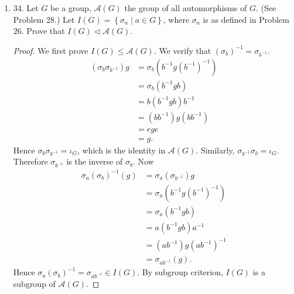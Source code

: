 \begin{enumerate}
(b) $\operatorname{Ker} \psi=Z(G)$, the center of $G$.
\begin{proof}
	\begin{align*}
		g \in Z(G) &\iff \forall x \in G, x g = g x\\
		&\iff \forall x \in G, g x g^{-1}  = x\\
		&\iff \forall x \in G, \sigma_g(x) = x \\
		&\iff \sigma_g = \iota_G\\
		&\iff \varphi(g) = \iota_G \\
		&\iff g \in \operatorname{ker} \varphi
	.\end{align*}
	Where $\iota_G$ is the identity map, which serves as the identity element in $A(G)$.
\end{proof}

	\item 34. Let $G$ be a group, $\mathscr{A}(G)$ the group of all automorphisms of $G$. (See Problem 28.) Let $I(G)=\left\{\sigma_a \mid a \in G\right\}$, where $\sigma_a$ is as defined in Problem $26 .$ Prove that $I(G) \triangleleft \mathscr{A}(G)$.
\begin{proof}
	We first prove $I(G) \le \mathscr{A}(G)$. We verify that $(\sigma_b)^{-1} = \sigma_{b^{-1} }$.
	\begin{align*}
		(\sigma_b \sigma_{b^{-1}}) g 
		&= \sigma_b (b^{-1}  g (b^{-1} )^{-1}) \\
		&= \sigma_b(b^{-1} gb) \\
		&= b(b^{-1} gb) b^{-1} \\
		&= (bb^{-1} )g(bb^{-1} ) \\
		&= e g e \\
		&= g
	.\end{align*}
	Hence $\sigma_b \sigma_{b^{-1} } = \iota_G$, which is the identity in $\mathscr{A}(G)$. Similarly, $\sigma_{b^{-1} }\sigma_b = \iota_G$. Therefore $\sigma_{b^{-1} }$ is the inverse of $\sigma_b$.
	Now
	\begin{align*}
		\sigma_a(\sigma_b)^{-1} (g)
		&= \sigma_a(\sigma_{b^{-1} })g \\
		&= \sigma_a (b^{-1} g (b^{-1} )^{-1}) \\
		&= \sigma_a (b^{-1} g b) \\
		&= a (b^{-1} g b)a^{-1}  \\
		&= (ab^{-1} )g (ab^{-1} )^{-1} \\
		&= \sigma_{ab^{-1} }(g)
	.\end{align*}
	Hence $\sigma_a (\sigma_b)^{-1} = \sigma_{ab^{-1} } \in I(G)$. By subgroup criterion,  $I(G)$ is a subgroup of $\mathscr{A}(G)$.


\end{proof}
\end{enumerate}
